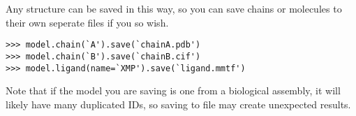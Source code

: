 Any structure can be saved in this way, so you can save chains or molecules to
their own seperate files if you so wish.

\begin{footnotesize}
\begin{verbatim}
>>> model.chain(`A').save(`chainA.pdb')
>>> model.chain(`B').save(`chainB.cif')
>>> model.ligand(name=`XMP').save(`ligand.mmtf')
\end{verbatim}
\end{footnotesize}

Note that if the model you are saving is one from a biological assembly, it will
likely have many duplicated IDs, so saving to file may create unexpected
results.


